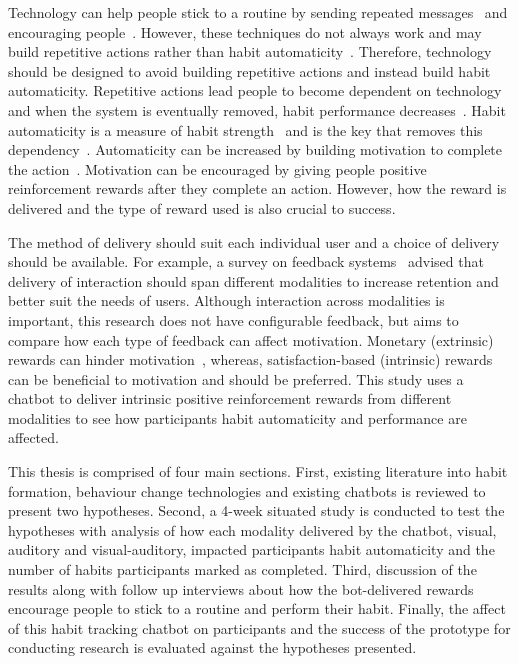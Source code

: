 Technology can help people stick to a routine by sending repeated messages~\cite{chi_crowd_designed_motivation} and encouraging people~\cite{positive_reinforcement_pro}. However, these techniques do not always work and may build repetitive actions rather than habit automaticity~\cite{coaching_not_that_good}. Therefore, technology should be designed to avoid building repetitive actions and instead build habit automaticity. Repetitive actions lead people to become dependent on technology and when the system is eventually removed, habit performance decreases~\cite{article_dont_kick_habit, article_realtime_feedback_improving_medication_taking}. Habit automaticity is a measure of habit strength~\cite{article_4q_SRBAI} and is the key that removes this dependency~\cite{article_beyond_self_tracking_designing_apps}. Automaticity can be increased by building motivation to complete the action~\cite{article_a_self_efficacy, article_meta_analytic_review_intrinsic_motivation}.
Motivation can be encouraged by giving people positive reinforcement rewards after they complete an action. However, how the reward is delivered and the type of reward used is also crucial to success.

The method of delivery should suit each individual user and a choice of delivery should be available. For example, a survey on feedback systems~\cite{article_user_centred_multimodal_reminders} advised that delivery of interaction should span different modalities to increase retention and better suit the needs of users. Although interaction across modalities is important, this research does not have configurable feedback, but aims to compare how each type of feedback can affect motivation. Monetary (extrinsic) rewards can hinder motivation~\cite{article_meta_analytic_review_intrinsic_motivation}, whereas, satisfaction-based (intrinsic) rewards can be beneficial to motivation and should be preferred.
This study uses a chatbot to deliver intrinsic positive reinforcement rewards from different modalities to see how participants habit automaticity and performance are affected.

This thesis is comprised of four main sections. First, existing literature into habit formation, behaviour change technologies and existing chatbots is reviewed to present two hypotheses. Second, a 4-week situated study is conducted to test the hypotheses with analysis of how each modality delivered by the chatbot, visual, auditory and visual-auditory, impacted participants habit automaticity and the number of habits participants marked as completed. Third, discussion of the results along with follow up interviews about how the bot-delivered rewards encourage people to stick to a routine and perform their habit. Finally, the affect of this habit tracking chatbot on participants and the success of the prototype for conducting research is evaluated against the hypotheses presented.

